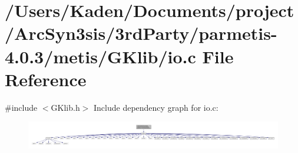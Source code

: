\hypertarget{a00855}{}\section{/\+Users/\+Kaden/\+Documents/project/\+Arc\+Syn3sis/3rd\+Party/parmetis-\/4.0.3/metis/\+G\+Klib/io.c File Reference}
\label{a00855}
{\ttfamily \#include $<$G\+Klib.\+h$>$}\newline
Include dependency graph for io.\+c\+:\nopagebreak
\begin{figure}[H]
\begin{center}
\leavevmode
\includegraphics[width=350pt]{a00856}
\end{center}
\end{figure}
